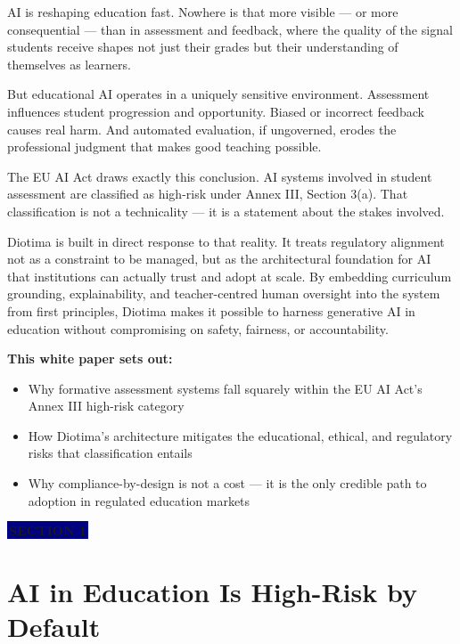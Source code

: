 \documentclass[11pt, a4paper]{article}
\newcommand{\sectiontag}[1]{%
  \vspace{4pt}%
  {\color{white}\colorbox{navy}{\small\bfseries\,#1\,}}%
  \vspace{6pt}%
}
\begin{document}
AI is reshaping education fast. Nowhere is that more visible --- or more consequential --- than in assessment and feedback, where the quality of the signal students receive shapes not just their grades but their understanding of themselves as learners.

But educational AI operates in a uniquely sensitive environment. Assessment influences student progression and opportunity. Biased or incorrect feedback causes real harm. And automated evaluation, if ungoverned, erodes the professional judgment that makes good teaching possible.

The EU AI Act draws exactly this conclusion. AI systems involved in student assessment are classified as high-risk under Annex III, Section 3(a). That classification is not a technicality --- it is a statement about the stakes involved.

Diotima is built in direct response to that reality. It treats regulatory alignment not as a constraint to be managed, but as the architectural foundation for AI that institutions can actually trust and adopt at scale. By embedding curriculum grounding, explainability, and teacher-centred human oversight into the system from first principles, Diotima makes it possible to harness generative AI in education without compromising on safety, fairness, or accountability.

\medskip
\textbf{This white paper sets out:}

\begin{itemize}
  \item Why formative assessment systems fall squarely within the EU AI Act's Annex III high-risk category
  \item How Diotima's architecture mitigates the educational, ethical, and regulatory risks that classification entails
  \item Why compliance-by-design is not a cost --- it is the only credible path to adoption in regulated education markets
\end{itemize}

\newpage

\tableofcontents

\newpage

\sectiontag{SECTION 1}

\section{AI in Education Is High-Risk by Default}
\end{document}
